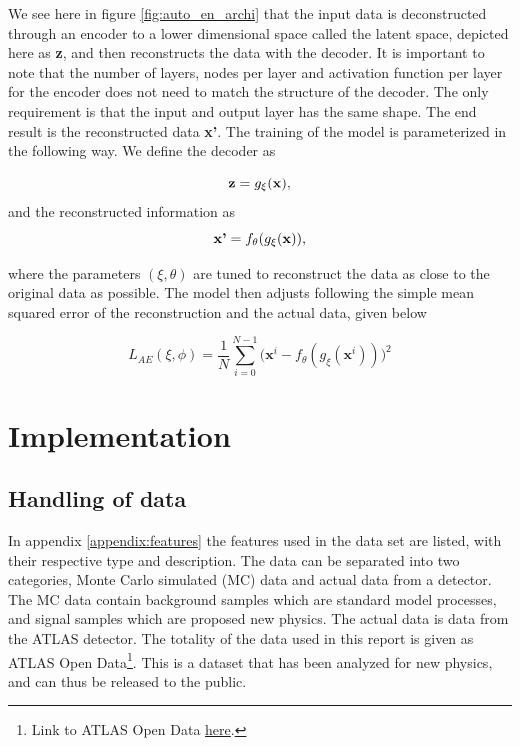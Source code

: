 \documentclass[ reprint, amsmath,amssymb, aps, nofootinbib]{revtex4-2}
\begin{document}
We see here in figure \ref{fig:auto_en_archi} that the input data is deconstructed through an encoder to a lower dimensional space called the latent space, depicted here as \textbf{z}, and then reconstructs the data with the decoder. It is important to note that the number of layers, nodes per layer and activation function per layer for the encoder does not need to match the structure of the decoder. The only requirement is that the input and output layer has the same shape. The end result is the reconstructed data \textbf{x'}. The training of the model is parameterized in the following way. We define the decoder as 

\begin{equation*}
    \textbf{z} = g_{\xi}(\bf{x}),
\end{equation*}
and the reconstructed information as 
\begin{equation*}
    \textbf{x'} = f_{\theta}(g_{\xi}(\bf{x})),
\end{equation*}

where the parameters $(\xi, \theta)$ are tuned to reconstruct the data as close to the original data as possible. The model then adjusts following the simple mean squared error of the reconstruction and the actual data, given below

\begin{equation*}
    L_{AE}(\xi, \phi)= \frac{1}{N} \sum_{i=0}^{N-1}\bigg( \textbf{x}^i - f_{\theta}(g_{\xi}(\textbf{x}^i))\bigg)^2
\end{equation*}



\section{Implementation}

\subsection{Handling of data}

In appendix \ref{appendix:features} the features used in the data set are listed, with their respective type and description. The data can be separated into two categories, Monte Carlo simulated (MC) data and actual data from a detector. The MC data contain background samples which are standard model processes, and signal samples which are proposed new physics. The actual data is data from the ATLAS detector. The totality of the data used in this report is given as ATLAS Open Data\footnote{Link to ATLAS Open Data \href{https://atlas.cern/resources/opendata}{here}.}. This is a dataset that has been analyzed for new physics, and can thus be released to the public. 
\end{document}
